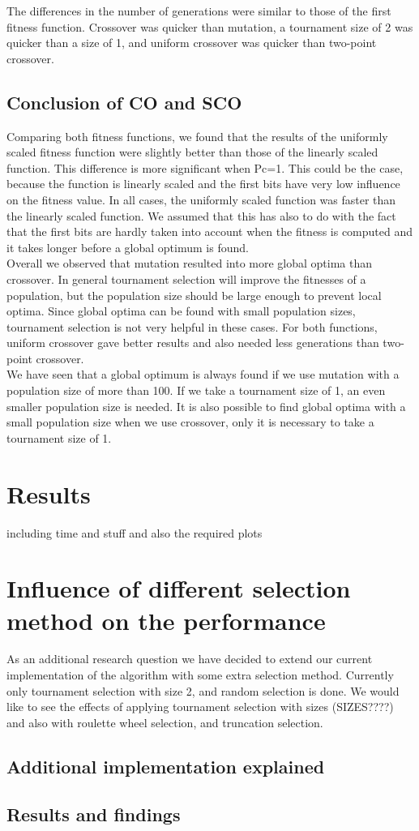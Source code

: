 \documentclass[10pt,a4paper,onecolumn]{article}
\begin{document}
The differences in the number of generations were similar to those of the first fitness function.
Crossover was quicker than mutation, a tournament size of 2 was quicker than a size of 1, and uniform crossover was quicker than two-point crossover.

\subsection{Conclusion of CO and SCO}

Comparing both fitness functions, we found that the results of the uniformly scaled fitness function were slightly better than those of the linearly scaled function.
This difference is more significant when Pc=1.
This could be the case, because the function is linearly scaled and the first bits have very low influence on the fitness value.
In all cases, the uniformly scaled function was faster than the linearly scaled function.
We assumed that this has also to do with the fact that the first bits are hardly taken into account when the fitness is computed and it takes longer before a global optimum is found. \\

Overall we observed that mutation resulted into more global optima than crossover.
In general tournament selection will improve the fitnesses of a population, but the population size should be large enough to prevent local optima.
Since global optima can be found with small population sizes, tournament selection is not very helpful in these cases.
For both functions, uniform crossover gave better results and also needed less generations than two-point crossover. \\

We have seen that a global optimum is always found if we use mutation with a population size of more than 100. If we take a tournament size of 1, an even smaller population size is needed.
It is also possible to find global optima with a small population size when we use crossover, only it is necessary to take a tournament size of 1.


\section{Results} \label{sec:results}
including time and stuff
and also the required plots

\section{Influence of different selection method on the performance}
\label{sec:research}
As an additional research question we have decided to extend our current implementation of the algorithm with some extra selection method. Currently only tournament selection with size 2, and random selection is done. We would like to see the effects of applying tournament selection with sizes (SIZES????) and also with roulette wheel selection, and truncation selection.

\subsection{Additional implementation explained}

\subsection{Results and findings}
\end{document}
